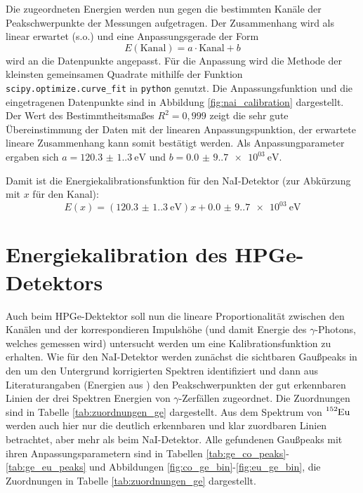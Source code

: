 Die zugeordneten Energien werden nun gegen die bestimmten Kanäle der Peakschwerpunkte der Messungen aufgetragen. Der Zusammenhang wird als linear erwartet (s.o.) und eine Anpassungsgerade der Form
\begin{equation}
E(\text{Kanal})=a\cdot \text{Kanal}+b
\end{equation}
wird an die Datenpunkte angepasst. Für die Anpassung wird die Methode der kleinsten gemeinsamen Quadrate mithilfe der Funktion \texttt{scipy.optimize.curve\_fit} in \texttt{python} genutzt. Die Anpassungsfunktion und die eingetragenen Datenpunkte sind in Abbildung \ref{fig:nai_calibration} dargestellt. Der Wert des Bestimmtheitsmaßes $R^2=0,999$ zeigt die sehr gute Übereinstimmung der Daten mit der linearen Anpassungspunktion, der erwartete lineare Zusammenhang kann somit bestätigt werden. Als Anpassungparameter ergaben sich
$a = \SI{120.3(1.3)}{\eV}$ und $b = \SI{0.0(9.7)e+03}{\eV}$.


Damit ist die Energiekalibrationsfunktion für den NaI-Detektor (zur Abkürzung mit $x$ für den Kanal):
\begin{equation}\label{eq:kalibration_nai}
    E(x)=(\SI{120.3(1.3)}{\eV})x +\SI{0.0(9.7)e+03}{\eV}
\end{equation}

\section{Energiekalibration des HPGe-Detektors} \label{sec:ge_cal}

Auch beim HPGe-Dektektor soll nun die lineare Proportionalität zwischen den Kanälen und der korrespondieren Impulshöhe (und damit Energie des $\gamma$-Photons, welches gemessen wird) untersucht werden um eine Kalibrationsfunktion zu erhalten. Wie für den NaI-Detektor werden zunächst die sichtbaren Gaußpeaks in den um den Untergrund korrigierten Spektren identifiziert und dann aus Literaturangaben (Energien aus \cite[8]{521versuchsanleitung}) den Peakschwerpunkten der gut erkennbaren Linien der drei Spektren Energien von $\gamma$-Zerfällen zugeordnet. Die Zuordnungen sind in Tabelle \ref{tab:zuordnungen_ge} dargestellt. Aus dem Spektrum von $\ce{^152Eu}$ werden auch hier nur die deutlich erkennbaren und klar zuordbaren Linien betrachtet, aber mehr als beim NaI-Detektor.
Alle gefundenen Gaußpeaks mit ihren Anpassungsparametern sind in Tabellen \ref{tab:ge_co_peaks}-\ref{tab:ge_eu_peaks} und Abbildungen \ref{fig:co_ge_bin}-\ref{fig:eu_ge_bin}, die Zuordnungen in Tabelle \ref{tab:zuordnungen_ge} dargestellt.

